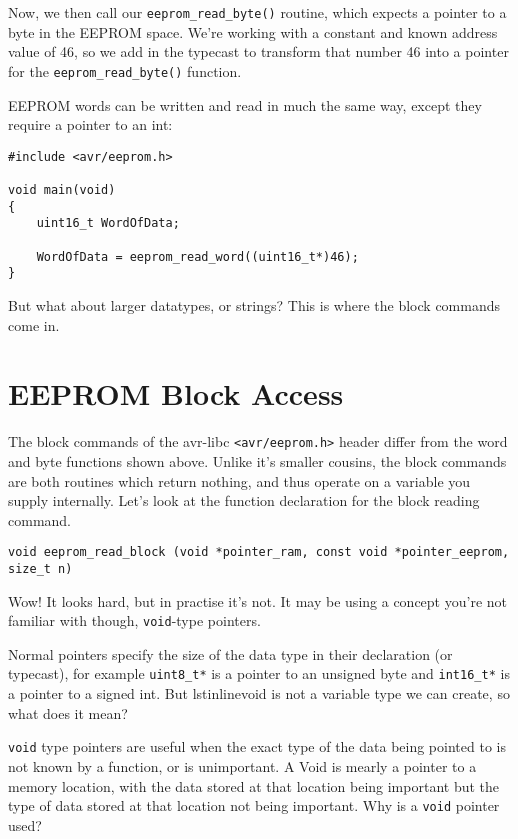 \documentclass[a4paper,oneside,notitlepage]{book}
\begin{document}
Now, we then call our \lstinline{eeprom_read_byte()} routine, which expects a pointer to a byte in the EEPROM space. We're working with a constant and known address value of 46, so we add in the typecast to transform that number 46 into a pointer for the \lstinline{eeprom_read_byte()} function.

EEPROM words can be written and read in much the same way, except they require a pointer to an int:

\begin{center}
\begin{lstlisting}
#include <avr/eeprom.h>

void main(void)
{
    uint16_t WordOfData;

    WordOfData = eeprom_read_word((uint16_t*)46);
}
\end{lstlisting}
\end{center}

But what about larger datatypes, or strings? This is where the block commands come in.


\chapter{EEPROM Block Access}

The block commands of the avr-libc \lstinline{<avr/eeprom.h>} header differ from the word and byte functions shown above. Unlike it's smaller cousins, the block commands are both routines which return nothing, and thus operate on a variable you supply internally. Let's look at the function declaration for the block reading command.

\begin{center}
\begin{lstlisting}
void eeprom_read_block (void *pointer_ram, const void *pointer_eeprom, size_t n)
\end{lstlisting}
\end{center}

Wow! It looks hard, but in practise it's not. It may be using a concept you're not familiar with though, \lstinline{void}-type pointers.

Normal pointers specify the size of the data type in their declaration (or typecast), for example \lstinline{uint8_t*} is a pointer to an unsigned byte and \lstinline{int16_t*} is a pointer to a signed int. But lstinline{void} is not a variable type we can create, so what does it mean?

\lstinline{void} type pointers are useful when the exact type of the data being pointed to is not known by a function, or is unimportant. A Void is mearly a pointer to a memory location, with the data stored at that location being important but the type of data stored at that location not being important. Why is a \lstinline{void} pointer used?
\end{document}
